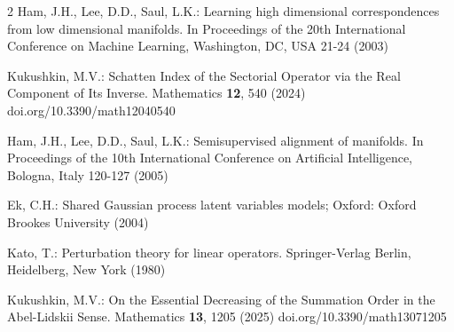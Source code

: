 \documentclass[a4paper,twoside,12pt]{article}
\begin{document}
\begin{thebibliography}{2}
     Ham, J.H., Lee, D.D., Saul, L.K.:   Learning high dimensional correspondences from
low dimensional manifolds. In Proceedings of
the 20th International Conference on Machine Learning, Washington, DC, USA  21-24 (2003)





    Kukushkin, M.V.:  Schatten
Index of the Sectorial Operator via the
Real Component of Its Inverse.    Mathematics   \textbf{12}, 540 (2024)  doi.org/10.3390/math12040540








      Ham, J.H., Lee, D.D., Saul, L.K.:  Semisupervised alignment of manifolds. In Proceedings of the 10th International Conference on
Artificial Intelligence, Bologna, Italy  120-127  (2005)

    Ek, C.H.:  Shared Gaussian process latent variables models;  Oxford: Oxford
Brookes University  (2004)





   Kato, T.:  Perturbation theory for linear operators.  Springer-Verlag Berlin, Heidelberg, New York  (1980)



 Kukushkin, M.V.:  On the Essential Decreasing of the Summation Order in the
Abel-Lidskii Sense.    Mathematics   \textbf{13},   1205  (2025)  doi.org/10.3390/math13071205









\end{thebibliography}
\end{document}
